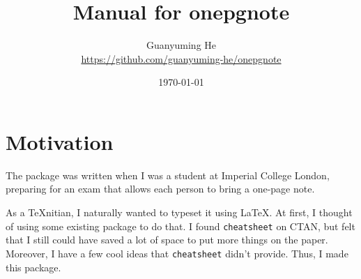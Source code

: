 \documentclass{article}
\author{Guanyuming He\\ \url{https://github.com/guanyuming-he/onepgnote}}
\date{\today}
\title{Manual for onepgnote}
\begin{document}
\pagestyle{empty}
\maketitle
\tableofcontents

\clearpage
\section{Motivation}
The package was written when I was a student at Imperial College London,
preparing for an exam that allows each person to bring a one-page note.

As a \TeX nitian, I naturally wanted to typeset it using \LaTeX. At first, I
thought of using some existing package to do that. I found \texttt{cheatsheet}
on CTAN, but felt that I still could have saved a lot of space to put more
things on the paper. Moreover, I have a few cool ideas that \texttt{cheatsheet}
didn't provide. Thus, I made this package.
\end{document}
